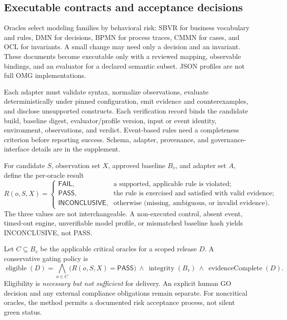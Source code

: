 \documentclass[11pt,a4paper]{article}
\newcommand{\PASS}{\textsf{PASS}}
\newcommand{\FAIL}{\textsf{FAIL}}
\newcommand{\INC}{\textsf{INCONCLUSIVE}}
\begin{document}
\subsection{Executable contracts and acceptance decisions}
Oracles select modeling families by behavioral risk: SBVR for business vocabulary and rules, DMN for decisions, BPMN for process traces, CMMN for cases, and OCL for invariants. A small change may need only a decision and an invariant. These documents become executable only with a reviewed mapping, observable bindings, and an evaluator for a declared semantic subset. JSON profiles are not full OMG implementations.

Each adapter must validate syntax, normalize observations, evaluate deterministically under pinned configuration, emit evidence and counterexamples, and disclose unsupported constructs. Each verification record binds the candidate build, baseline digest, evaluator/profile version, input or event identity, environment, observations, and verdict. Event-based rules need a completeness criterion before reporting success. Schema, adapter, provenance, and governance-interface details are in the supplement.

For candidate $S$, observation set $X$, approved baseline $B_v$, and adapter set $A$, define the per-oracle result
\begin{equation}
R(o,S,X)=\begin{cases}
\FAIL{}, & \text{a supported, applicable rule is violated};\\
\PASS{}, & \text{the rule is exercised and satisfied with valid evidence};\\
\INC{}, & \text{otherwise (missing, ambiguous, or invalid evidence).}
\end{cases}
\label{eq:tristate}
\end{equation}
The three values are not interchangeable. A non-executed control, absent event, timed-out engine, unverifiable model profile, or mismatched baseline hash yields \INC{}, not \PASS{}.

Let $C\subseteq B_v$ be the applicable critical oracles for a scoped release $D$. A conservative gating policy is
\begin{equation}
\operatorname{eligible}(D)=\bigwedge_{o\in C}
\big(R(o,S,X)=\PASS{}\big)\ \land\ \operatorname{integrity}(B_v)\ \land\ \operatorname{evidenceComplete}(D).
\end{equation}
Eligibility is \emph{necessary but not sufficient} for delivery. An explicit human \textsf{GO} decision and any external compliance obligations remain separate. For noncritical oracles, the method permits a documented risk acceptance process, not silent green status.
\end{document}
